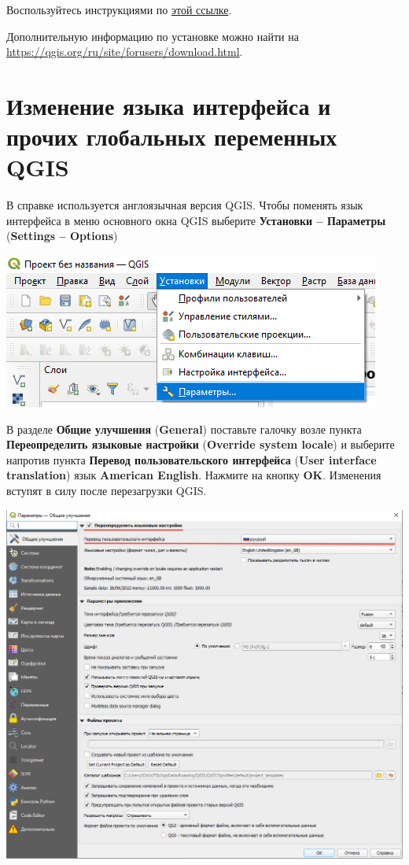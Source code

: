 \documentclass[
  12pt,
]{book}
\begin{document}
Воспользуйтесь инструкциями по \href{https://qgis.org/ru/site/forusers/alldownloads.html\#linux}{этой ссылке}.

Дополнительную информацию по установке можно найти на \url{https://qgis.org/ru/site/forusers/download.html}.

\section{Изменение языка интерфейса и прочих глобальных переменных QGIS}\label{global}

В справке используется англоязычная версия QGIS. Чтобы поменять язык интерфейса в меню основного окна QGIS выберите \textbf{Установки -- Параметры} (\textbf{Settings -- Options})

\includegraphics{images/Index0/Options.png}

В разделе \textbf{Общие улучшения} (\textbf{General}) поставьте галочку возле пункта \textbf{Переопределить языковые настройки} (\textbf{Override system locale}) и выберите напротив пункта \textbf{Перевод пользовательского интерфейса} (\textbf{User interface translation}) язык \textbf{American English}. Нажмите на кнопку \textbf{OK}. Изменения вступят в силу после перезагрузки QGIS.

\includegraphics{images/Index0/Interface.png}
\end{document}
